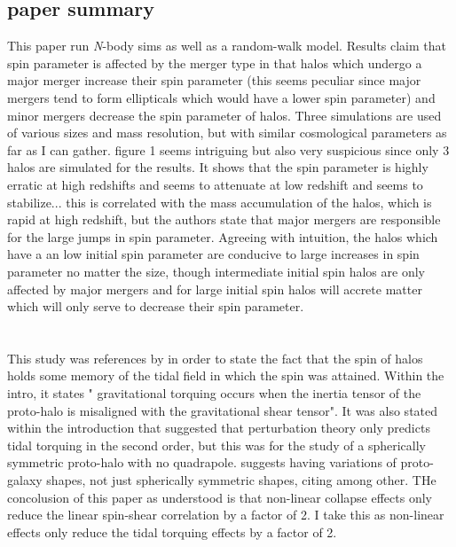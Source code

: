 \documentclass[fleqn,usenatbib]{mnras}
\begin{document}
\subsection{paper summary}
This paper run \textit{N}-body sims as well as a random-walk model. Results claim that spin parameter is affected by the merger type in that halos which undergo a major merger increase their spin parameter (this seems peculiar since major mergers tend to form ellipticals which would have a lower spin parameter) and minor mergers decrease the spin parameter of halos.
Three simulations are used of various sizes and mass resolution, but with similar cosmological parameters as far as I can gather.
figure 1 seems intriguing but also very suspicious since only 3 halos are simulated for the results. It shows that the spin parameter is highly erratic at high redshifts and seems to attenuate at low redshift and seems to stabilize... this is correlated with the mass accumulation of the halos, which is rapid at high redshift, but the authors state that major mergers are responsible for the large jumps in spin parameter. Agreeing with intuition, the halos which have a an low initial spin parameter are conducive to large increases in spin parameter no matter the size, though intermediate initial spin halos are only affected by major mergers and for large initial spin halos will accrete matter which will only serve to decrease their spin parameter.

\section{\citet{Lee_pen_00}}

This study was references by \citet{Trowland_13} in order to state the fact that the spin of halos holds some memory of the tidal field in which the spin was attained.
Within the intro, it states " gravitational torquing occurs when the inertia tensor of the proto-halo is misaligned with the gravitational shear tensor". It was also stated within the introduction that \citet{Peebles_69} suggested that perturbation theory only predicts tidal torquing in the second order, but this was for the study of a spherically symmetric proto-halo with no quadrapole. \citet{Lee_pen_00} suggests having variations of proto-galaxy shapes, not just spherically symmetric shapes, citing \citet{White84} among other. THe concolusion of this paper as understood is that non-linear collapse effects only reduce the linear spin-shear correlation by a factor of 2. I take this as non-linear effects only reduce the tidal torquing effects by a factor of 2.
\end{document}
